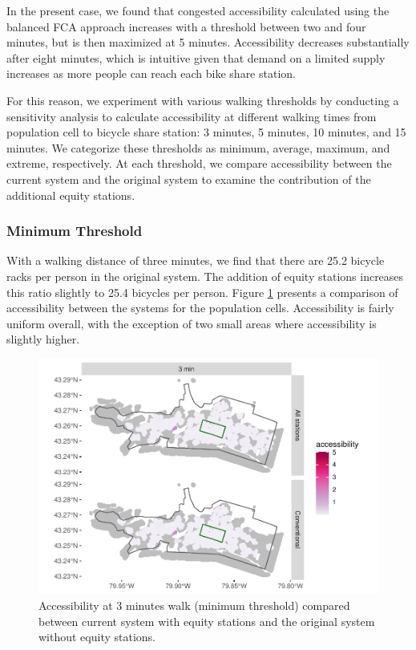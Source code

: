 \documentclass[]{elsarticle} %
\begin{document}
In the present case, we found that congested accessibility calculated
using the balanced FCA approach increases with a threshold between two
and four minutes, but is then maximized at 5 minutes. Accessibility
decreases substantially after eight minutes, which is intuitive given
that demand on a limited supply increases as more people can reach each
bike share station.

For this reason, we experiment with various walking thresholds by
conducting a sensitivity analysis to calculate accessibility at
different walking times from population cell to bicycle share station: 3
minutes, 5 minutes, 10 minutes, and 15 minutes. We categorize these
thresholds as minimum, average, maximum, and extreme, respectively. At
each threshold, we compare accessibility between the current system and
the original system to examine the contribution of the additional equity
stations.

\hypertarget{minimum-threshold}{%
\subsubsection{Minimum Threshold}\label{minimum-threshold}}

With a walking distance of three minutes, we find that there are 25.2
bicycle racks per person in the original system. The addition of equity
stations increases this ratio slightly to 25.4 bicycles per person.
Figure \ref{fig:figure-6} presents a comparison of accessibility between
the systems for the population cells. Accessibility is fairly uniform
overall, with the exception of two small areas where accessibility is
slightly higher.

\begin{figure}
 
 {\centering \includegraphics[width=0.9\linewidth]{Bike-share-spatial-equity_files/figure-latex/figure-6-1} 
 
 }
 
 \caption{Accessibility at 3 minutes walk (minimum threshold) compared between current system with equity stations and the original system without equity stations.}\label{fig:figure-6}
 \end{figure}
\end{document}
